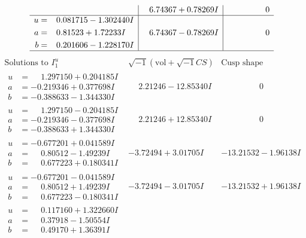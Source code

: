 \documentclass[1p]{elsarticle_modified}
\theoremstyle{definition}
\newcommand{\I}{\sqrt{-1}}
\begin{document}
$$\begin{array}{c|c|c}
 & \phantom{-}6.74367 + 0.78269 I & \phantom{-0.000000 } 0 \\ \hline\begin{aligned}
u &= \phantom{-}0.081715 - 1.302440 I \\
a &= \phantom{-}0.81523 + 1.72233 I \\
b &= \phantom{-}0.201606 - 1.228170 I\end{aligned}
 & \phantom{-}6.74367 - 0.78269 I & \phantom{-0.000000 } 0\\
 \hline 
 \end{array}$$\newpage$$\begin{array}{c|c|c}  
\text{Solutions to }I^u_{1}& \I (\text{vol} + \sqrt{-1}CS) & \text{Cusp shape}\\
 \hline 
\begin{aligned}
u &= \phantom{-}1.297150 + 0.204185 I \\
a &= -0.219346 + 0.377698 I \\
b &= -0.388633 - 1.344330 I\end{aligned}
 & \phantom{-}2.21246 - 12.85340 I & \phantom{-0.000000 } 0 \\ \hline\begin{aligned}
u &= \phantom{-}1.297150 - 0.204185 I \\
a &= -0.219346 - 0.377698 I \\
b &= -0.388633 + 1.344330 I\end{aligned}
 & \phantom{-}2.21246 + 12.85340 I & \phantom{-0.000000 } 0 \\ \hline\begin{aligned}
u &= -0.677201 + 0.041589 I \\
a &= \phantom{-}0.80512 - 1.49239 I \\
b &= \phantom{-}0.677223 + 0.180341 I\end{aligned}
 & -3.72494 + 3.01705 I & -13.21532 - 1.96138 I \\ \hline\begin{aligned}
u &= -0.677201 - 0.041589 I \\
a &= \phantom{-}0.80512 + 1.49239 I \\
b &= \phantom{-}0.677223 - 0.180341 I\end{aligned}
 & -3.72494 - 3.01705 I & -13.21532 + 1.96138 I \\ \hline\begin{aligned}
u &= \phantom{-}0.117160 + 1.322660 I \\
a &= \phantom{-}0.37918 - 1.50554 I \\
b &= \phantom{-}0.49170 + 1.36391 I\end{aligned}

\end{array}$$
\end{document}
